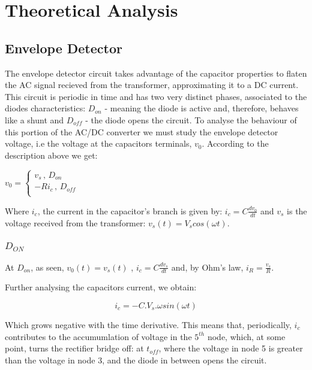 \section{Theoretical Analysis}
\label{sec:analysis}

\subsection{Envelope Detector}

The envelope detector circuit takes advantage of the capacitor properties to flaten the AC signal recieved from the transformer, approximating it to a DC current. This circuit is periodic in time and has two very distinct phases, associated to the diodes characteristics: $D_{on}$ - meaning the diode is active and, therefore, behaves like a shunt and $D_{off}$ - the diode opens the circuit. To analyse the behaviour of this portion of the AC/DC converter we must study the envelope detector voltage, i.e the voltage at the capacitors terminals, $v_0$. According to the description above we get:

\begin{center}
$
v_0 = 
\begin{cases} 
v_s \, , \, D_{on} \\ - R i_c \, , \, D_{off}\\ 
\end{cases}
$
\end{center}

Where $i_c$, the current in the capacitor's branch is given by: $i_c = C\frac{dv_0}{dt}$ and $v_s$ is the voltage received from the transformer: $v_s(t) = V_scos(\omega t)$.

\subsubsection{$D_{ON}$}

At $D_{on}$, as seen, $v_0(t) = v_s(t)$ , $i_c = C\frac{dv_s}{dt}$ and, by Ohm's law, $i_R = \frac{v_s}{R}$.\par

Further analysing the capacitors current, we obtain:

\begin{center}
	\begin{equation}
	i_c = -C.V_s.\omega sin(\omega t)
	\end{equation}
\end{center}

Which grows negative with the time derivative. This means that, periodically, $i_c$ contributes to the accumumlation of voltage in the $5^{th}$ node, which, at some point, turns the rectifier bridge off: at $t_{off}$, where the voltage in node 5 is greater than the voltage in node 3, and the diode in between opens the circuit.

